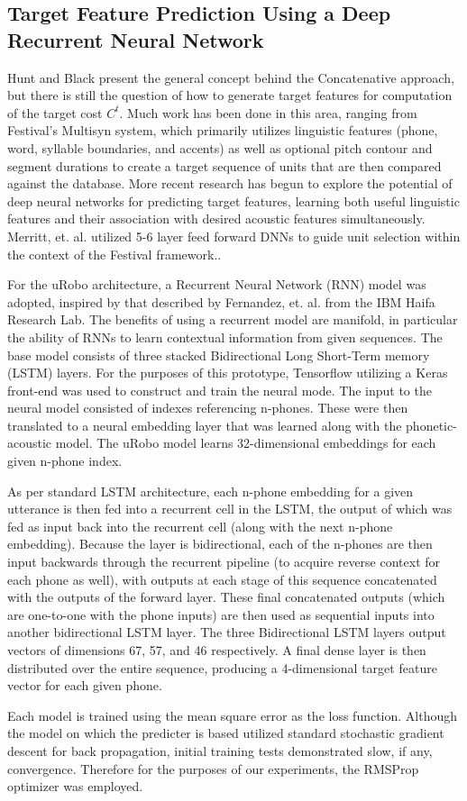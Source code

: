 \documentclass[10pt, journal, compsoc]{IEEEtran}
\begin{document}
\subsection{Target Feature Prediction Using a Deep Recurrent Neural Network}
Hunt and Black present the general concept behind the Concatenative approach, but there is still the question of how to generate target features for computation of the target cost $C^t$. Much work has been done in this area, ranging from Festival's Multisyn system, which primarily utilizes linguistic features (phone, word, syllable boundaries, and accents)\cite{a102c4924c19470ab180d278d2029de5} as well as optional pitch contour and segment durations to create a target sequence of units that are then compared against the database. More recent research has begun to explore the potential of deep neural networks for predicting target features, learning both useful linguistic features and their association with desired acoustic features simultaneously. Merritt, et. al. utilized 5-6 layer feed forward DNNs to guide unit selection within the context of the Festival framework.\cite{7472658}.\par
For the uRobo architecture, a Recurrent Neural Network (RNN) model was adopted, inspired by that described by Fernandez, et. al. from the IBM Haifa Research Lab. The benefits of using a recurrent model are manifold, in particular the ability of RNNs to learn contextual information from given sequences. The base model consists of three stacked Bidirectional Long Short-Term memory (LSTM) layers.\cite{unknowndnn} For the purposes of this prototype, Tensorflow utilizing a Keras front-end was used to construct and train the neural mode.\cite{chollet2015keras} The input to the neural model consisted of indexes referencing n-phones. These were then translated to a neural embedding layer that was learned along with the phonetic-acoustic model. The uRobo model learns 32-dimensional embeddings for each given n-phone index. \par 
As per standard LSTM architecture, each n-phone embedding for a given utterance is then fed into a recurrent cell in the LSTM, the output of which was fed as input back into the recurrent cell (along with the next n-phone embedding). Because the layer is bidirectional, each of the n-phones are then input backwards through the recurrent pipeline (to acquire reverse context for each phone as well), with outputs at each stage of this sequence concatenated with the outputs of the forward layer. These final concatenated outputs (which are one-to-one with the phone inputs) are then used as sequential inputs into another bidirectional LSTM layer. The three Bidirectional LSTM layers output vectors of dimensions 67, 57, and 46 respectively.\cite{unknowndnn} A final dense layer is then distributed over the entire sequence, producing a 4-dimensional target feature vector for each given phone.\par
Each model is trained using the mean square error as the loss function. Although the model on which the predicter is based utilized standard stochastic gradient descent\cite{unknowndnn} for back propagation, initial training tests demonstrated slow, if any, convergence. Therefore for the purposes of our experiments, the RMSProp optimizer was employed.\par
\end{document}
